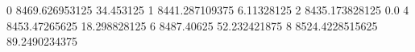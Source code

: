 0 8469.626953125 34.453125
1 8441.287109375 6.11328125
2 8435.173828125 0.0
4 8453.47265625 18.298828125
6 8487.40625 52.232421875
8 8524.4228515625 89.2490234375
